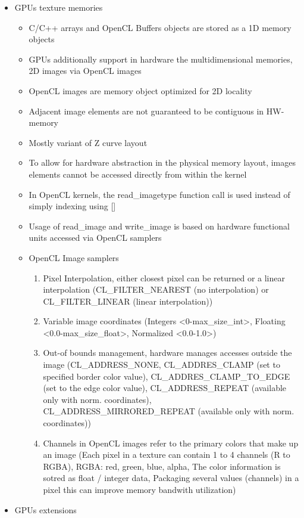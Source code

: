 \documentclass[paper=a4, fontsize=11pt]{scrartcl} %
\numberwithin{equation}{section} %
\numberwithin{figure}{section} %
\numberwithin{table}{section} %
\begin{document}
\begin{itemize}
  \item GPUs texture memories
  \begin{itemize}
    \item C/C++ arrays and OpenCL Buffers objects are stored as a 1D memory objects
    \item GPUs additionally support in hardware the multidimensional memories, 2D images via OpenCL images
    \item OpenCL images are memory object optimized for 2D locality
    \item Adjacent image elements are not guaranteed to be contiguous in HW-memory
    \item Mostly variant of Z curve layout
    \item To allow for hardware abstraction in the physical memory layout, images elements cannot be accessed directly from within the kernel
    \item In OpenCL kernels, the read_image{type} function call is used instead of simply indexing using []
    \item Usage of read_image and write_image is based on hardware functional units accessed via OpenCL samplers
    \item OpenCL Image samplers
    \begin{enumerate}
      \item Pixel Interpolation, either closest pixel can be returned or a linear interpolation (CL_FILTER_NEAREST (no interpolation) or CL_FILTER_LINEAR (linear interpolation))
      \item Variable image coordinates (Integers <0-max_size_int>, Floating <0.0-max_size_float>, Normalized <0.0-1.0>)
      \item Out-of bounds management, hardware manages accesses outside the image (CL_ADDRESS_NONE, CL_ADDRES_CLAMP (set to specified border color value), CL_ADDRES_CLAMP_TO_EDGE (set to the edge color value), CL_ADDRESS_REPEAT (available only with norm. coordinates), CL_ADDRESS_MIRRORED_REPEAT (available only with norm. coordinates))
      \item Channels in OpenCL images refer to the primary colors that make up an image (Each pixel in a texture can contain 1 to 4 channels (R to RGBA), RGBA: red, green, blue, alpha, The color information is sotred as float / integer data, Packaging several values (channels) in a pixel this can improve memory bandwith utilization)
    \end{enumerate}
  \end{itemize}
  \item GPUs extensions

\end{itemize}
\end{document}
